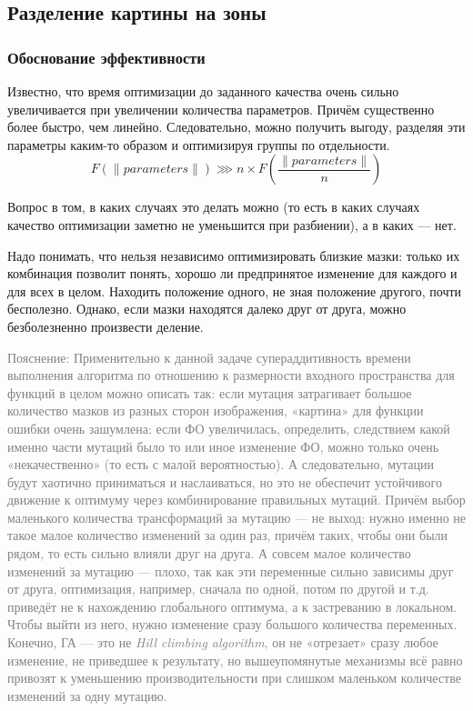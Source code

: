 \subsection{Разделение картины на зоны}\label{subsec:applying_zoning}

\subsubsection{Обоснование эффективности}\label{subsubsec:why_split_into_zones}
Известно, что время оптимизации до заданного качества очень сильно увеличивается при увеличении количества параметров.
Причём существенно более быстро, чем линейно.
Следовательно, можно получить выгоду, разделяя эти параметры каким-то образом и оптимизируя группы по отдельности.
\begin{equation}
    F(\lVert parameters \lVert) \ggg n \times F  \left( \frac{\lVert parameters \lVert}{n} \right)
\end{equation}

Вопрос в том, в каких случаях это делать можно (то есть в каких случаях качество оптимизации заметно не уменьшится при разбиении), а в каких — нет.

Надо понимать, что нельзя независимо оптимизировать близкие мазки: только их комбинация позволит понять,
хорошо ли предпринятое изменение для каждого и для всех в целом.
Находить положение одного, не зная положение другого, почти бесполезно.
Однако, если мазки находятся далеко друг от друга, можно безболезненно произвести деление.

\textcolor{gray}{Пояснение: Применительно к данной задаче супераддитивность времени выполнения алгоритма по отношению к размерности входного пространства для функций в целом
можно описать так: если мутация затрагивает большое количество мазков из разных сторон изображения, «картина» для функции ошибки очень зашумлена:
если ФО увеличилась, определить, следствием какой именно части мутаций было то или иное изменение ФО, можно только очень «некачественно» (то есть с малой вероятностью).
А следовательно, мутации будут хаотично приниматься и наслаиваться, но это не обеспечит устойчивого движение к оптимуму через комбинирование правильных мутаций.
Причём выбор маленького количества трансформаций за мутацию — не выход: нужно именно не такое малое количество изменений за один раз, причём таких, чтобы они были рядом,
то есть сильно влияли друг на друга.
А совсем малое количество изменений за мутацию — плохо, так как эти переменные сильно зависимы друг от друга, оптимизация, например, сначала по одной, потом по другой и т.д.
приведёт не к нахождению глобального оптимума, а к застреванию в локальном.
Чтобы выйти из него, нужно изменение сразу большого количества переменных.
Конечно, ГА — это не \textit{Hill climbing algorithm}, он не «отрезает» сразу любое изменение, не приведшее к результату,
но вышеупомянутые механизмы всё равно привозят к уменьшению производительности при слишком маленьком количестве изменений за одну мутацию.}

